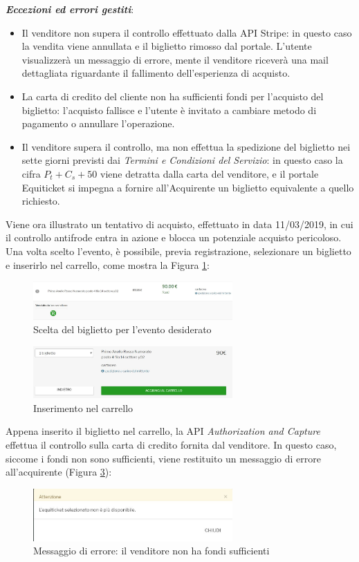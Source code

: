\textbf{\textit{Eccezioni ed errori gestiti}}: 
\begin{itemize}
\item Il venditore non supera il controllo effettuato dalla API Stripe: in questo caso la vendita viene annullata e il biglietto rimosso dal portale. L'utente visualizzerà un messaggio di errore, mente il venditore riceverà una mail dettagliata riguardante il fallimento dell'esperienza di acquisto. 
\item La carta di credito del cliente non ha sufficienti fondi per l'acquisto del biglietto: l'acquisto fallisce e l'utente è invitato a cambiare metodo di pagamento o annullare l'operazione. 
\item Il venditore supera il controllo, ma non effettua la spedizione del biglietto nei sette giorni previsti dai \textit{Termini e Condizioni del Servizio}: in questo caso la cifra $P_{t} + C_{s} + 50$ viene detratta dalla carta del venditore, e il portale Equiticket si impegna a fornire all'Acquirente un biglietto equivalente a quello richiesto. 
\end{itemize}
Viene ora illustrato un tentativo di acquisto, effettuato in data 11/03/2019, in cui il controllo antifrode entra in azione e blocca un potenziale acquisto pericoloso. 
Una volta scelto l'evento, è possibile, previa registrazione, selezionare un biglietto e inserirlo nel carrello, come mostra la Figura \ref{acq1}: 
\begin{figure}[htbp]
	\centering
	\includegraphics[width=0.68\textwidth]{chapter4/immagini/acquisto1}
	\caption{Scelta del biglietto per l'evento desiderato}
	\label{acq1}
\end{figure}
\begin{figure}[htbp]
	\centering
	\includegraphics[width=0.68\textwidth]{chapter4/immagini/acquisto2}
	\caption{Inserimento nel carrello}
	\label{acq2}
\end{figure}
Appena inserito il biglietto nel carrello, la API \textit{Authorization and Capture} effettua il controllo sulla carta di credito fornita dal venditore. In questo caso, siccome i fondi non sono sufficienti, viene restituito un messaggio di errore all'acquirente (Figura \ref{fail1}):
\begin{figure}[htbp]
	\centering
	\includegraphics[width=0.68\textwidth]{chapter4/immagini/acquisto3}
	\caption{Messaggio di errore: il venditore non ha fondi sufficienti}
	\label{fail1}
\end{figure} 
